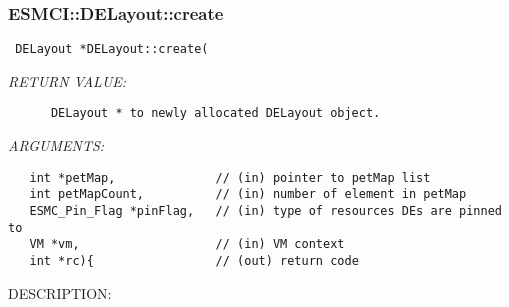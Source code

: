  
\setlength{\oldparskip}{\parskip}
\setlength{\parskip}{1.5ex}
\setlength{\oldparindent}{\parindent}
\setlength{\parindent}{0pt}
\setlength{\oldbaselineskip}{\baselineskip}
\setlength{\baselineskip}{11pt}
 
\def\bv{\begin{verbatim}}
\def\ev{\end{verbatim}}
\def\be{\begin{equation}}
\def\ee{\end{equation}}
\def\bea{\begin{eqnarray}}
\def\eea{\end{eqnarray}}
\def\bi{\begin{itemize}}
\def\ei{\end{itemize}}
\def\bn{\begin{enumerate}}
\def\en{\end{enumerate}}
\def\bd{\begin{description}}
\def\ed{\end{description}}
\def\({\left (}
\def\){\right )}
\def\[{\left [}
\def\]{\right ]}
\def\<{\left  \langle}
\def\>{\right \rangle}
\def\cI{{\cal I}}
\def\diag{\mathop{\rm diag}}
\def\tr{\mathop{\rm tr}}


 
\subsubsection [ESMCI::DELayout::create] {ESMCI::DELayout::create}


  
\begin{verbatim} DELayout *DELayout::create(\end{verbatim}{\em RETURN VALUE:}
\begin{verbatim}      DELayout * to newly allocated DELayout object.\end{verbatim}{\em ARGUMENTS:}
\begin{verbatim}   int *petMap,              // (in) pointer to petMap list
   int petMapCount,          // (in) number of element in petMap
   ESMC_Pin_Flag *pinFlag,   // (in) type of resources DEs are pinned to
   VM *vm,                   // (in) VM context
   int *rc){                 // (out) return code\end{verbatim}
{\sf DESCRIPTION:\\ }


